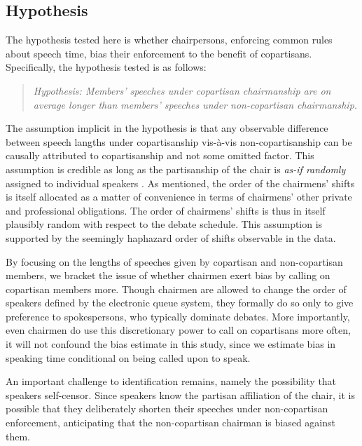 \documentclass[12pt,a4paper]{article}
\begin{document}
\subsection{Hypothesis}
The hypothesis tested here is whether chairpersons, enforcing common rules about speech time, bias their enforcement to the benefit of copartisans. Specifically, the hypothesis tested is as follows:

\begin{quote}
\textit{Hypothesis: Members' speeches under copartisan chairmanship are on average longer than members' speeches under non-copartisan chairmanship.}
\end{quote}

The assumption implicit in the hypothesis is that any observable difference between speech langths under copartisanship vis-à-vis non-copartisanship can be causally attributed to copartisanship and not some omitted factor. This assumption is credible as long as the partisanship of the chair is \textit{as-if randomly} assigned to individual speakers \citep{Dunning2007}. As mentioned, the order of the chairmens' shifts is itself allocated as a matter of convenience in terms of chairmens' other private and professional obligations. The order of chairmens' shifts is thus in itself plausibly random with respect to the debate schedule. This assumption is supported by the seemingly haphazard order of shifts observable in the data.

By focusing on the lengths of speeches given by copartisan and non-copartisan members, we bracket the issue of whether chairmen exert bias by calling on copartisan members more. Though chairmen are allowed to change the order of speakers defined by the electronic queue system, they formally do so only to give preference to spokespersons, who typically dominate debates. More importantly, even chairmen do use this discretionary power to call on copartisans more often, it will not confound the bias estimate in this study, since we estimate bias in speaking time conditional on being called upon to speak.

An important challenge to identification remains, namely the possibility that speakers self-censor. Since speakers know the partisan affiliation of the chair, it is possible that they deliberately shorten their speeches under non-copartisan enforcement, anticipating that the non-copartisan chairman is biased against them. 
\end{document}

